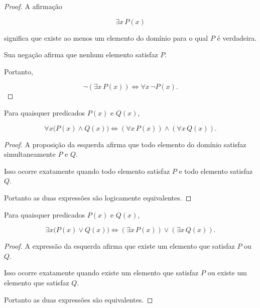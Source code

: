 \documentclass[../../main]{subfiles}
\begin{document}
\begin{proof}

	A afirmação

	\[
		\exists x\,P(x)
	\]

	significa que existe ao menos um elemento do domínio para o qual
	\(P\) é verdadeira.

	Sua negação afirma que nenhum elemento satisfaz \(P\).

	Portanto,

	\[
		\neg(\exists x\,P(x))
		\Leftrightarrow
		\forall x\,\neg P(x).
	\]

\end{proof}

\begin{prop}
	\label{prop:matematica:logica-matematica:logica-de-predicados:universal-conjuncao}

	Para quaisquer predicados \(P(x)\) e \(Q(x)\),

	\[
		\forall x \bigl(P(x)\land Q(x)\bigr)
		\Leftrightarrow
		(\forall x\,P(x))
		\land
		(\forall x\,Q(x)).
	\]

\end{prop}

\begin{proof}

	A proposição da esquerda afirma que todo elemento do domínio satisfaz
	simultaneamente \(P\) e \(Q\).

	Isso ocorre exatamente quando todo elemento satisfaz \(P\) e todo
	elemento satisfaz \(Q\).

	Portanto as duas expressões são logicamente equivalentes.

\end{proof}

\begin{prop}
	\label{prop:matematica:logica-matematica:logica-de-predicados:existencial-disjuncao}

	Para quaisquer predicados \(P(x)\) e \(Q(x)\),

	\[
		\exists x \bigl(P(x)\lor Q(x)\bigr)
		\Leftrightarrow
		(\exists x\,P(x))
		\lor
		(\exists x\,Q(x)).
	\]

\end{prop}

\begin{proof}

	A expressão da esquerda afirma que existe um elemento que satisfaz
	\(P\) ou \(Q\).

	Isso ocorre exatamente quando existe um elemento que satisfaz \(P\) ou
	existe um elemento que satisfaz \(Q\).

	Portanto as duas expressões são equivalentes.

\end{proof}
\end{document}
